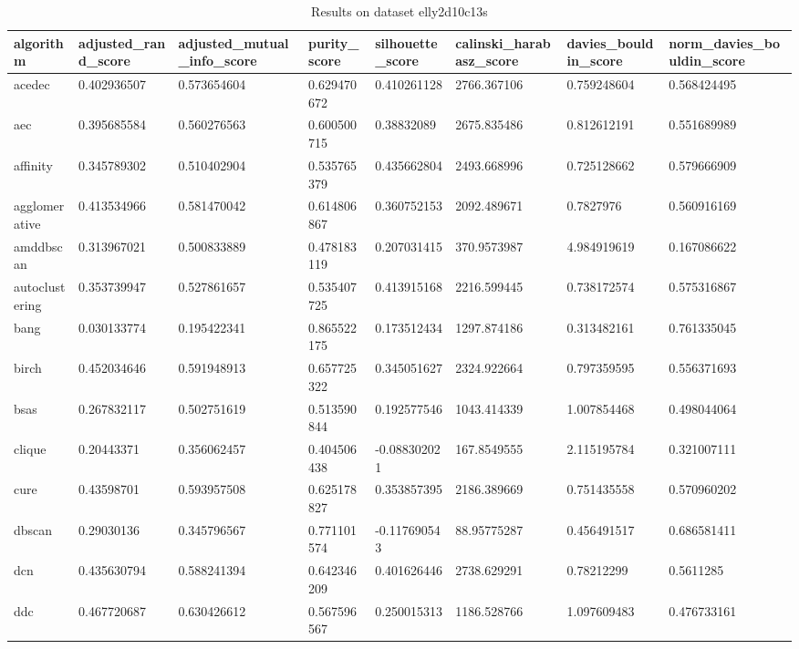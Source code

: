 \begin{table}[H]
\centering
\caption{Results on dataset elly2d10c13s}
\label{tab:params:elly2d10c13s}
\begin{tabular}{|l|l|l|l|l|l|l|l|}
\hline
algorithm & adjusted\_rand\_score & adjusted\_mutual\_info\_score & purity\_score & silhouette\_score & calinski\_harabasz\_score & davies\_bouldin\_score & norm\_davies\_bouldin\_score \\
\hline
acedec & 0.402936507 & 0.573654604 & 0.629470672 & 0.410261128 & 2766.367106 & 0.759248604 & 0.568424495 \\
\hline
aec & 0.395685584 & 0.560276563 & 0.600500715 & 0.38832089 & 2675.835486 & 0.812612191 & 0.551689989 \\
\hline
affinity & 0.345789302 & 0.510402904 & 0.535765379 & 0.435662804 & 2493.668996 & 0.725128662 & 0.579666909 \\
\hline
agglomerative & 0.413534966 & 0.581470042 & 0.614806867 & 0.360752153 & 2092.489671 & 0.7827976 & 0.560916169 \\
\hline
amddbscan & 0.313967021 & 0.500833889 & 0.478183119 & 0.207031415 & 370.9573987 & 4.984919619 & 0.167086622 \\
\hline
autoclustering & 0.353739947 & 0.527861657 & 0.535407725 & 0.413915168 & 2216.599445 & 0.738172574 & 0.575316867 \\
\hline
bang & 0.030133774 & 0.195422341 & 0.865522175 & 0.173512434 & 1297.874186 & 0.313482161 & 0.761335045 \\
\hline
birch & 0.452034646 & 0.591948913 & 0.657725322 & 0.345051627 & 2324.922664 & 0.797359595 & 0.556371693 \\
\hline
bsas & 0.267832117 & 0.502751619 & 0.513590844 & 0.192577546 & 1043.414339 & 1.007854468 & 0.498044064 \\
\hline
clique & 0.20443371 & 0.356062457 & 0.404506438 & -0.088302021 & 167.8549555 & 2.115195784 & 0.321007111 \\
\hline
cure & 0.43598701 & 0.593957508 & 0.625178827 & 0.353857395 & 2186.389669 & 0.751435558 & 0.570960202 \\
\hline
dbscan & 0.29030136 & 0.345796567 & 0.771101574 & -0.117690543 & 88.95775287 & 0.456491517 & 0.686581411 \\
\hline
dcn & 0.435630794 & 0.588241394 & 0.642346209 & 0.401626446 & 2738.629291 & 0.78212299 & 0.5611285 \\
\hline
ddc & 0.467720687 & 0.630426612 & 0.567596567 & 0.250015313 & 1186.528766 & 1.097609483 & 0.476733161 \\

\end{tabular}
\end{table}
